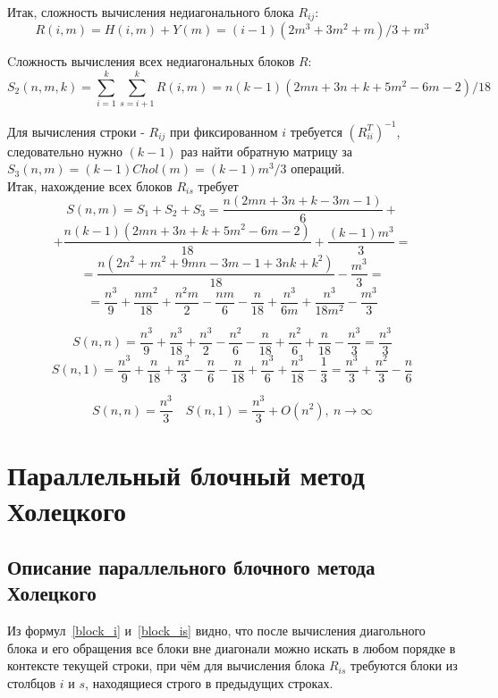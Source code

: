 \documentclass[a4paper,12pt]{article}
\begin{document}
    Итак, сложность вычисления недиагонального блока $R_{ij}$:
    $$ 
        R(i,m) = H(i,m) + Y(m) =
        (i-1)(2m^3+3m^2+m)/3 + m^3
    $$
    
    Cложность вычисления всех недиагональных блоков $R$:
    $$ 
        S_2(n,m,k) = 
        \sum_{i=1}^k\sum_{s=i+1}^k R(i,m) =
        n(k-1)(2mn+3n+k+5m^2-6m-2)/18
    $$
    
    Для вычисления строки - $R_{ij}$ при фиксированном $i$ требуется $(R_{ii}^T)^{-1}$,
    следовательно нужно $(k-1)$ раз найти обратную матрицу за \\
    $S_3(n, m) = (k-1)Chol(m) = (k-1)m^3/3$ операций. \\
    
    Итак, нахождение всех блоков $R_{is}$ требует
    $$
        S(n, m)= S_1 + S_2 + S_3 = 
        \frac{n(2mn + 3n + k - 3m -1)}6 + $$$$ +
        \frac{n(k-1)(2mn+3n+k+5m^2-6m-2)}{18} +
        \frac{(k-1)m^3}3 = $$$$ =
        \frac{n(2n^2+m^2+9mn-3m-1+3nk+k^2)}{18} - \frac{m^3}3 = $$$$ =
        \boxed {
            \frac{n^3}9 + \frac{nm^2}{18} + \frac{n^2m}2 - \frac{nm}6 -
            \frac{n}{18} + \frac{n^3}{6m} + \frac{n^3}{18m^2} - \frac{m^3}3  }
    $$
    
    $$ 
        S(n,n) =
        \frac{n^3}9 + \frac{n^3}{18} + \frac{n^3}2 - \frac{n^2}6 - 
        \frac{n}{18} + \frac{n^2}6 + \frac{n}{18} - \frac{n^3}3 = 
        \frac{n^3}3
    $$
    $$
        S(n,1) = 
        \frac{n^3}9 + \frac{n}{18} + \frac{n^2}3 - \frac{n}6 -
        \frac{n}{18} + \frac{n^3}6 + \frac{n^3}{18} - \frac{1}3 =
        \frac{n^3}3 + \frac{n^2}3 - \frac{n}6
    $$
    
    $$
        \boxed {
            S(n,n) = \frac{n^3}3 \quad 
            S(n,1) = \frac{n^3}3 + O(n^2),\ n \to \infty   }
    $$
    
    


\newpage
\section{Параллельный блочный метод Холецкого}
\subsection{Описание параллельного блочного метода Холецкого}
    Из формул~\eqref{block_i} и~\eqref{block_is} видно, что после вычисления диагольного 
    блока и его обращения все блоки вне диагонали можно искать в любом порядке в 
    контексте текущей строки, при чём для вычисления блока $R_{is}$ требуются блоки 
    из столбцов $i$ и $s$, находящиеся строго в предыдущих строках. \\
    
\end{document}
